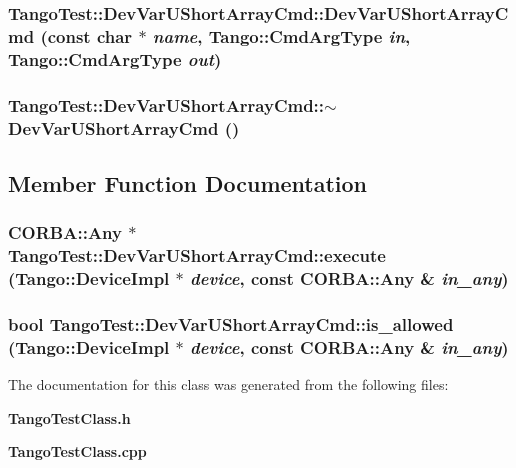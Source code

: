 \subsubsection{\setlength{\rightskip}{0pt plus 5cm}Tango\-Test::Dev\-Var\-UShort\-Array\-Cmd::Dev\-Var\-UShort\-Array\-Cmd (const char $\ast$ {\em name}, Tango::Cmd\-Arg\-Type {\em in}, Tango::Cmd\-Arg\-Type {\em out})}\label{classTangoTest_1_1DevVarUShortArrayCmd_a1}


\subsubsection{\setlength{\rightskip}{0pt plus 5cm}Tango\-Test::Dev\-Var\-UShort\-Array\-Cmd::$\sim$Dev\-Var\-UShort\-Array\-Cmd ()\hspace{0.3cm}{\tt  [inline]}}\label{classTangoTest_1_1DevVarUShortArrayCmd_a2}




\subsection{Member Function Documentation}
\subsubsection{\setlength{\rightskip}{0pt plus 5cm}CORBA::Any $\ast$ Tango\-Test::Dev\-Var\-UShort\-Array\-Cmd::execute (Tango::Device\-Impl $\ast$ {\em device}, const CORBA::Any \& {\em in\_\-any})\hspace{0.3cm}{\tt  [virtual]}}\label{classTangoTest_1_1DevVarUShortArrayCmd_a4}


\subsubsection{\setlength{\rightskip}{0pt plus 5cm}bool Tango\-Test::Dev\-Var\-UShort\-Array\-Cmd::is\_\-allowed (Tango::Device\-Impl $\ast$ {\em device}, const CORBA::Any \& {\em in\_\-any})\hspace{0.3cm}{\tt  [virtual]}}\label{classTangoTest_1_1DevVarUShortArrayCmd_a3}




The documentation for this class was generated from the following files:\begin{CompactItemize}
\item 
{\bf Tango\-Test\-Class.h}\item 
{\bf Tango\-Test\-Class.cpp}\end{CompactItemize}
